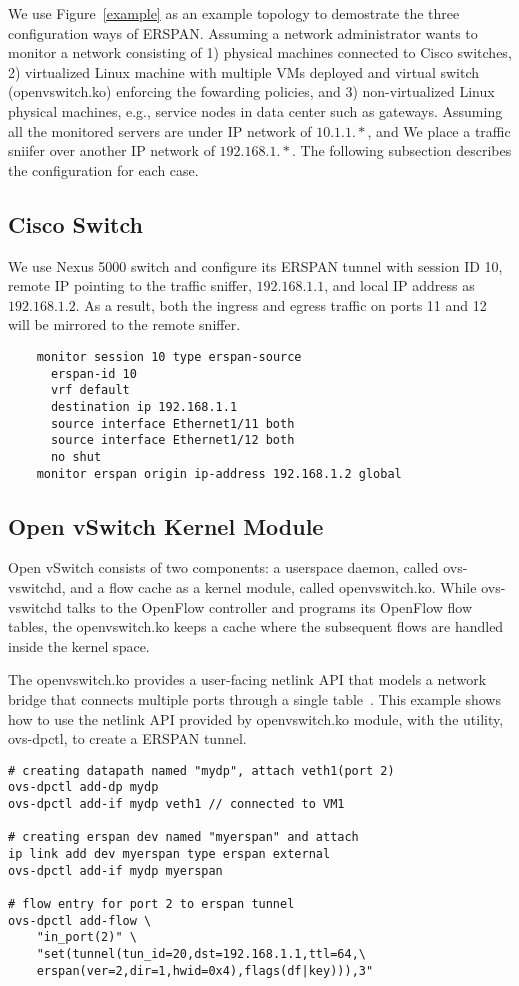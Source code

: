 \documentclass[10pt]{sigplanconf}
\begin{document}
We use Figure~\ref{example} as an example topology to demostrate
the three configuration ways of ERSPAN.
Assuming a network administrator wants to monitor a network consisting
of 1) physical machines connected to Cisco switches, 2)
virtualized Linux machine with multiple VMs deployed and virtual switch
(openvswitch.ko) enforcing the fowarding policies, and
3) non-virtualized Linux physical machines, e.g., service nodes
in data center such as gateways.
Assuming all the monitored servers are under IP network of $10.1.1.*$,
and We place a traffic sniifer over another IP network of $192.168.1.*$.
The following subsection describes the configuration for each case.

\subsection{Cisco Switch}
We use Nexus 5000 switch and configure its ERSPAN tunnel
with session ID 10, remote IP pointing to the traffic sniffer, $192.168.1.1$,
and local IP address as $192.168.1.2$.  As a result, both the ingress and
egress traffic on ports 11 and 12 will be mirrored to the remote sniffer.
\begin{verbatim}
    monitor session 10 type erspan-source
      erspan-id 10
      vrf default
      destination ip 192.168.1.1
      source interface Ethernet1/11 both
      source interface Ethernet1/12 both
      no shut
    monitor erspan origin ip-address 192.168.1.2 global
\end{verbatim}


\subsection{Open vSwitch Kernel Module}\label{ovs}
Open vSwitch consists of two components: a userspace daemon, called ovs-vswitchd,
and a flow cache as a kernel module, called openvswitch.ko.  While ovs-vswitchd
talks to the OpenFlow controller and programs its OpenFlow flow tables,
the openvswitch.ko keeps a cache where the subsequent flows are handled
inside the kernel space.

The openvswitch.ko provides a user-facing netlink API that models a network
bridge that connects multiple ports through a single table~\cite{ovswoovs}.
This example shows how to use the netlink API provided by openvswitch.ko
module, with the utility, ovs-dpctl, to create a ERSPAN tunnel.
\begin{verbatim}
# creating datapath named "mydp", attach veth1(port 2)
ovs-dpctl add-dp mydp
ovs-dpctl add-if mydp veth1 // connected to VM1

# creating erspan dev named "myerspan" and attach
ip link add dev myerspan type erspan external
ovs-dpctl add-if mydp myerspan

# flow entry for port 2 to erspan tunnel 
ovs-dpctl add-flow \
    "in_port(2)" \
    "set(tunnel(tun_id=20,dst=192.168.1.1,ttl=64,\
    erspan(ver=2,dir=1,hwid=0x4),flags(df|key))),3"
\end{verbatim}
\end{document}
